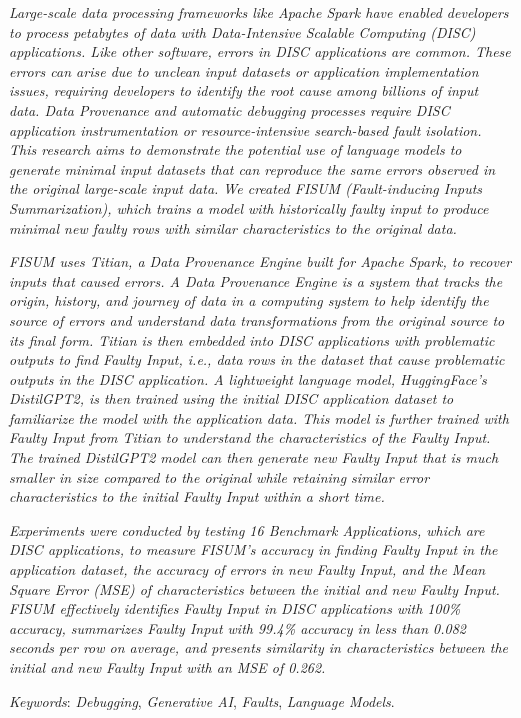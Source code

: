 \emph{Large-scale data processing frameworks like Apache Spark have enabled developers to process petabytes of data with Data-Intensive Scalable Computing (DISC) applications. Like other software, errors in DISC applications are common. These errors can arise due to unclean input datasets or application implementation issues, requiring developers to identify the root cause among billions of input data. Data Provenance and automatic debugging processes require DISC application instrumentation or resource-intensive search-based fault isolation. This research aims to demonstrate the potential use of language models to generate minimal input datasets that can reproduce the same errors observed in the original large-scale input data. We created FISUM (Fault-inducing Inputs Summarization), which trains a model with historically faulty input to produce minimal new faulty rows with similar characteristics to the original data.}

\emph{FISUM uses Titian, a Data Provenance Engine built for Apache Spark, to recover inputs that caused errors. A Data Provenance Engine is a system that tracks the origin, history, and journey of data in a computing system to help identify the source of errors and understand data transformations from the original source to its final form. Titian is then embedded into DISC applications with problematic outputs to find Faulty Input, i.e., data rows in the dataset that cause problematic outputs in the DISC application. A lightweight language model, HuggingFace's DistilGPT2, is then trained using the initial DISC application dataset to familiarize the model with the application data. This model is further trained with Faulty Input from Titian to understand the characteristics of the Faulty Input. The trained DistilGPT2 model can then generate new Faulty Input that is much smaller in size compared to the original while retaining similar error characteristics to the initial Faulty Input within a short time.}

\emph{Experiments were conducted by testing 16 Benchmark Applications, which are DISC applications, to measure FISUM's accuracy in finding Faulty Input in the application dataset, the accuracy of errors in new Faulty Input, and the Mean Square Error (MSE) of characteristics between the initial and new Faulty Input. FISUM effectively identifies Faulty Input in DISC applications with 100\% accuracy, summarizes Faulty Input with 99.4\% accuracy in less than 0.082 seconds per row on average, and presents similarity in characteristics between the initial and new Faulty Input with an MSE of 0.262.}


\emph{Keywords}: \emph{Debugging}, \emph{Generative AI}, \emph{Faults}, \emph{Language Models}.
